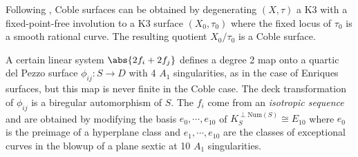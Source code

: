\documentclass[../../main.tex]{subfiles}
\begin{document}
\begin{remark}
Following \cite[\S 5.1]{Dol17}, Coble surfaces can be obtained by degenerating $(X, \tau)$ a K3 with a fixed-point-free involution to a K3 surface $(X_0, \tau_0)$ where the fixed locus of $\tau_0$ is a smooth rational curve. The resulting quotient $X_0/\tau_0$ is a Coble surface. 

A certain linear system $\abs{2f_i + 2f_j}$ defines a degree 2 map onto a quartic del Pezzo surface $\phi_{ij}: S\to D$ with 4 $A_1$ singularities, as in the case of Enriques surfaces, but this map is never finite in the Coble case. The deck transformation of $\phi_{ij}$ is a biregular automorphism of $S$. The $f_i$ come from an \textit{isotropic sequence} and are obtained by modifying the basis $e_0,\cdots, e_{10}$ of $K_S^{\perp \mathrm{Num}(S)} \cong E_{10}$ where $e_0$ is the preimage of a hyperplane class and $e_1,\cdots, e_{10}$ are the classes of exceptional curves in the blowup of a plane sextic at 10 $A_1$ singularities.

\end{remark}
\end{document}
